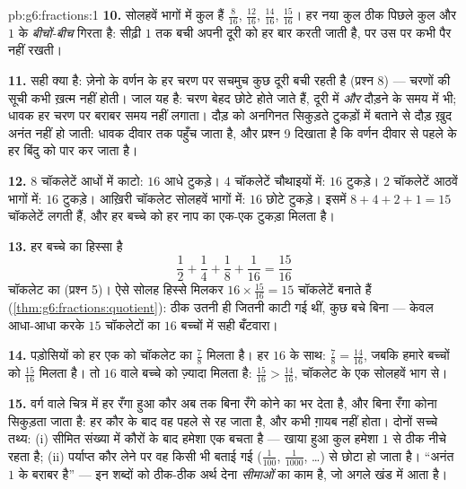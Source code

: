 \begin{solution}{pb:g6:fractions:1}
\textbf{10.} सोलहवें भागों में कुल हैं $\frac{8}{16}$,
$\frac{12}{16}$, $\frac{14}{16}$, $\frac{15}{16}$। हर नया कुल
ठीक पिछले कुल और $1$ के \emph{बीचों-बीच} गिरता है: सीढ़ी $1$ तक
बची अपनी दूरी को हर बार  करती जाती है, पर उस पर कभी पैर नहीं रखती।

\textbf{11.} सही क्या है: ज़ेनो के वर्णन के हर चरण पर सचमुच कुछ
दूरी बची रहती है (प्रश्न 8) --- चरणों की सूची कभी ख़त्म नहीं
होती। जाल यह है: चरण बेहद छोटे होते जाते हैं, दूरी में
\emph{और} दौड़ने के समय में भी; धावक हर चरण पर बराबर समय नहीं
लगाता। दौड़ को अनगिनत सिकुड़ते टुकड़ों में बताने से दौड़ ख़ुद
अनंत नहीं हो जाती: धावक दीवार तक पहुँच जाता है, और प्रश्न 9
दिखाता है कि वर्णन दीवार से पहले के हर बिंदु को पार कर जाता है।

\textbf{12.} $8$ चॉकलेटें आधों में काटो: $16$ आधे टुकड़े। $4$
चॉकलेटें चौथाइयों में: $16$  टुकड़े। $2$ चॉकलेटें आठवें
भागों में: $16$ टुकड़े। आख़िरी चॉकलेट सोलहवें भागों में:
$16$ छोटे टुकड़े। इसमें $8 + 4 + 2 + 1 = 15$ चॉकलेटें लगती हैं,
और हर बच्चे को हर नाप का एक-एक टुकड़ा मिलता है।

\textbf{13.} हर बच्चे का हिस्सा है
\[
\frac12 + \frac14 + \frac18 + \frac{1}{16} = \frac{15}{16}
\]
चॉकलेट का (प्रश्न 5)। ऐसे सोलह हिस्से मिलकर
$16 \times \frac{15}{16} = 15$ चॉकलेटें बनाते हैं
(\cref{thm:g6:fractions:quotient}): ठीक उतनी ही जितनी काटी गई
थीं, कुछ बचे बिना --- केवल आधा-आधा करके $15$ चॉकलेटों का $16$
बच्चों में सही बँटवारा।

\textbf{14.} पड़ोसियों को हर एक को चॉकलेट का $\frac78$ मिलता है।
हर $16$ के साथ: $\frac78 = \frac{14}{16}$, जबकि हमारे बच्चों को
$\frac{15}{16}$ मिलता है। तो $16$ वाले बच्चे को ज़्यादा मिलता है:
$\frac{15}{16} > \frac{14}{16}$, चॉकलेट के एक सोलहवें भाग से।

\textbf{15.} वर्ग वाले चित्र में हर रँगा हुआ कौर अब तक बिना रँगे
कोने का  भर देता है, और बिना रँगा कोना सिकुड़ता जाता है: हर
कौर के बाद वह पहले से  रह जाता है, और कभी ग़ायब नहीं होता।
दोनों सच्चे तथ्य: (i) सीमित संख्या में कौरों के बाद हमेशा एक
 बचता है --- खाया हुआ कुल हमेशा $1$ से ठीक नीचे रहता है;
(ii) पर्याप्त कौर लेने पर वह  किसी भी बताई गई 
($\frac{1}{100}$, $\frac{1}{1000}$, \dots) से छोटा हो जाता है।
``अनंत  $1$ के बराबर है'' --- इन शब्दों को ठीक-ठीक अर्थ देना
\emph{सीमाओं} का काम है, जो अगले खंड में आता है।

\end{solution}

